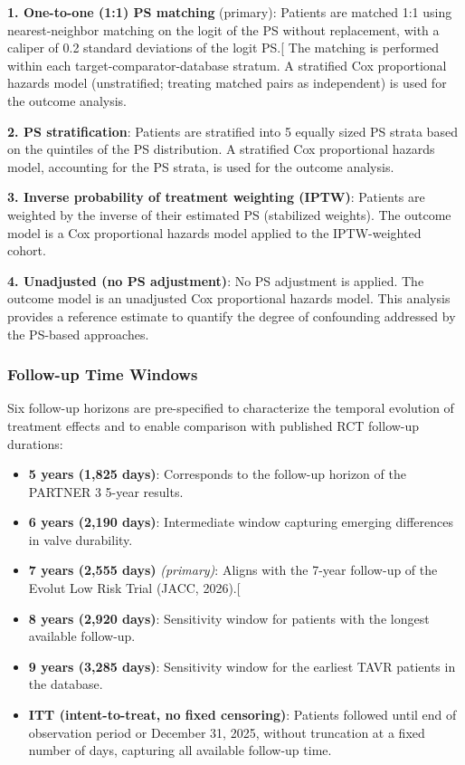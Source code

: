 \documentclass[
  12pt,
]{article}
\providecommand{\tightlist}{%
  \setlength{\itemsep}{0pt}\setlength{\parskip}{0pt}}
\begin{document}
\textbf{1. One-to-one (1:1) PS matching} (primary): Patients are matched
1:1 using nearest-neighbor matching on the logit of the PS without
replacement, with a caliper of 0.2 standard deviations of the logit
PS.{[}\citeproc{ref-Austin2011}{20}{]} The matching is performed within
each target-comparator-database stratum. A stratified Cox proportional
hazards model (unstratified; treating matched pairs as independent) is
used for the outcome analysis.

\textbf{2. PS stratification}: Patients are stratified into 5 equally
sized PS strata based on the quintiles of the PS distribution. A
stratified Cox proportional hazards model, accounting for the PS strata,
is used for the outcome analysis.

\textbf{3. Inverse probability of treatment weighting (IPTW)}: Patients
are weighted by the inverse of their estimated PS (stabilized weights).
The outcome model is a Cox proportional hazards model applied to the
IPTW-weighted cohort.

\textbf{4. Unadjusted (no PS adjustment)}: No PS adjustment is applied.
The outcome model is an unadjusted Cox proportional hazards model. This
analysis provides a reference estimate to quantify the degree of
confounding addressed by the PS-based approaches.

\subsubsection{Follow-up Time Windows}\label{follow-up-time-windows}

Six follow-up horizons are pre-specified to characterize the temporal
evolution of treatment effects and to enable comparison with published
RCT follow-up durations:

\begin{itemize}
\tightlist
\item
  \textbf{5 years (1,825 days)}: Corresponds to the follow-up horizon of
  the PARTNER 3 5-year results.
\item
  \textbf{6 years (2,190 days)}: Intermediate window capturing emerging
  differences in valve durability.
\item
  \textbf{7 years (2,555 days)} \emph{(primary)}: Aligns with the 7-year
  follow-up of the Evolut Low Risk Trial (JACC,
  2026).{[}\citeproc{ref-Forrest2026}{16}{]}
\item
  \textbf{8 years (2,920 days)}: Sensitivity window for patients with
  the longest available follow-up.
\item
  \textbf{9 years (3,285 days)}: Sensitivity window for the earliest
  TAVR patients in the database.
\item
  \textbf{ITT (intent-to-treat, no fixed censoring)}: Patients followed
  until end of observation period or December 31, 2025, without
  truncation at a fixed number of days, capturing all available
  follow-up time.
\end{itemize}
\end{document}
